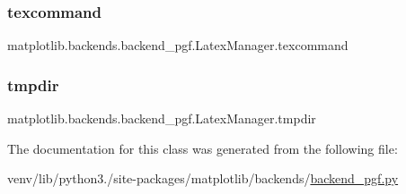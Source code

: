 \subsubsection{\texorpdfstring{texcommand}{texcommand}}
{\footnotesize\ttfamily matplotlib.\+backends.\+backend\+\_\+pgf.\+Latex\+Manager.\+texcommand}

\mbox{\label{classmatplotlib_1_1backends_1_1backend__pgf_1_1LatexManager_a6377ab21736ae14fc102469e94ecfb4e}} 
\subsubsection{\texorpdfstring{tmpdir}{tmpdir}}
{\footnotesize\ttfamily matplotlib.\+backends.\+backend\+\_\+pgf.\+Latex\+Manager.\+tmpdir}



The documentation for this class was generated from the following file\+:\begin{DoxyCompactItemize}
\item 
venv/lib/python3./site-\/packages/matplotlib/backends/\hyperlink{backend__pgf_8py}{backend\+\_\+pgf.\+py}\end{DoxyCompactItemize}
